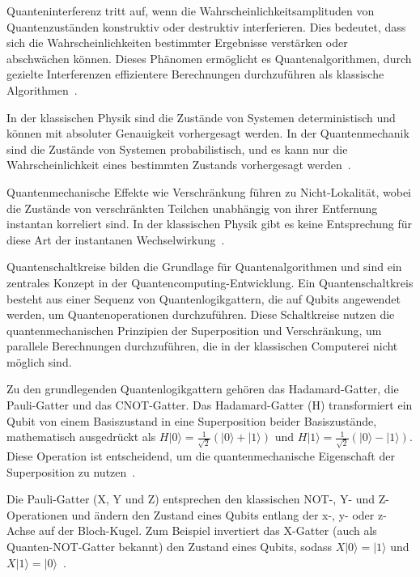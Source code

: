 Quanteninterferenz tritt auf, wenn die Wahrscheinlichkeitsamplituden von Quantenzuständen konstruktiv oder 
destruktiv interferieren. Dies bedeutet, dass sich die Wahrscheinlichkeiten bestimmter Ergebnisse verstärken oder 
abschwächen können. Dieses Phänomen ermöglicht es Quantenalgorithmen, durch gezielte Interferenzen effizientere 
Berechnungen durchzuführen als klassische Algorithmen~\cite{feynman2018simulating}.

In der klassischen Physik sind die Zustände von Systemen deterministisch und können mit absoluter Genauigkeit 
vorhergesagt werden. In der Quantenmechanik sind die Zustände von Systemen probabilistisch, und es kann 
nur die Wahrscheinlichkeit eines bestimmten Zustands vorhergesagt werden~\cite{griffiths2018introduction}. 

Quantenmechanische Effekte wie Verschränkung führen zu Nicht-Lokalität, wobei die Zustände von verschränkten 
Teilchen unabhängig von ihrer Entfernung instantan korreliert sind. In der klassischen Physik gibt es keine 
Entsprechung für diese Art der instantanen Wechselwirkung~\cite{aspect1982experimental}. 

Quantenschaltkreise bilden die Grundlage für Quantenalgorithmen und sind ein zentrales Konzept in der 
Quantencomputing-Entwicklung. Ein Quantenschaltkreis besteht aus einer Sequenz von Quantenlogikgattern, 
die auf Qubits angewendet werden, um Quantenoperationen durchzuführen. Diese Schaltkreise nutzen die 
quantenmechanischen Prinzipien der Superposition und Verschränkung, um parallele Berechnungen durchzuführen, 
die in der klassischen Computerei nicht möglich sind.

Zu den grundlegenden Quantenlogikgattern gehören das Hadamard-Gatter, die Pauli-Gatter und das CNOT-Gatter. 
Das Hadamard-Gatter (H) transformiert ein Qubit von einem Basiszustand in eine Superposition beider 
Basiszustände, mathematisch ausgedrückt als \( H|0\rangle = \frac{1}{\sqrt{2}}(|0\rangle + |1\rangle) \) 
und \( H|1\rangle = \frac{1}{\sqrt{2}}(|0\rangle - |1\rangle) \). Diese Operation ist entscheidend, um 
die quantenmechanische Eigenschaft der Superposition zu nutzen~\cite{griffiths2018introduction}.

Die Pauli-Gatter (X, Y und Z) entsprechen den klassischen NOT-, Y- und Z-Operationen und ändern den 
Zustand eines Qubits entlang der x-, y- oder z-Achse auf der Bloch-Kugel. Zum Beispiel invertiert 
das X-Gatter (auch als Quanten-NOT-Gatter bekannt) den Zustand eines Qubits, 
sodass \( X|0\rangle = |1\rangle \) und \( X|1\rangle = |0\rangle \)~\cite{nielsen2010quantum}.

